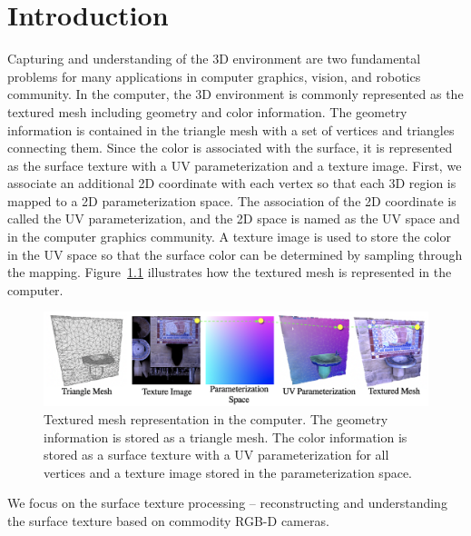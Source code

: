 \chapter{Introduction}
Capturing and understanding of the 3D environment are two fundamental problems for many applications in computer graphics, vision, and robotics community.
%
In the computer, the 3D environment is commonly represented as the textured mesh including geometry and color information. The geometry information is contained in the triangle mesh with a set of vertices and triangles connecting them. Since the color is associated with the surface, it is represented as the surface texture with a UV parameterization and a texture image. First, we associate an additional 2D coordinate with each vertex so that each 3D region is mapped to a 2D parameterization space. The association of the 2D coordinate is called the UV parameterization, and the 2D space is named as the UV space and in the computer graphics community. A texture image is used to store the color in the UV space so that the surface color can be determined by sampling through the mapping. Figure~\ref{fig:intro-texture-represent} illustrates how the textured mesh is represented in the computer.
\begin{figure}
    \centering
    \includegraphics[width=\linewidth]{intro/texture-represent.png}
    \caption{Textured mesh representation in the computer. The geometry information is stored as a triangle mesh. The color information is stored as a surface texture with a UV parameterization for all vertices and a texture image stored in the parameterization space.}
    \label{fig:intro-texture-represent}
\end{figure}
We focus on the surface texture processing -- reconstructing and understanding the surface texture based on commodity RGB-D cameras.

